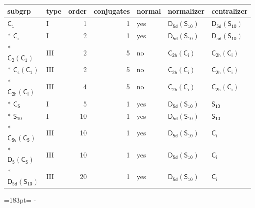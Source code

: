\documentclass[10pt,a4paper]{article}
\newcommand{\needspace}[1]{\par\penalty-100\begingroup\dimen0=#1\relax\dimen2=\pagegoal
  \advance\dimen2-\pagetotal\ifdim\dimen0>\dimen2\relax\ifdim\dimen2>0pt\vfil\break\fi\fi
  \endgroup}
\numberwithin{equation}{section}
\newcommand{\grp}[1]{\mathsf{#1}}
\begin{document}
{\small\begin{longtable}{@{}llrrlll@{}}\toprule
subgrp & type & order & conjugates & normal & normalizer & centralizer\\\midrule\endhead
\bottomrule\endfoot\endlastfoot
\href{../../../rotation/data/pdf/C1.pdf}{$\grp{C_{1}}$} & I & 1 & 1 & yes & \href{D5d-S10.pdf}{$\grp{D_{5d}}(\grp{S_{10}})$} & \href{D5d-S10.pdf}{$\grp{D_{5d}}(\grp{S_{10}})$}\\*
\href{../../../rotation/data/pdf/S2.pdf}{$\grp{C_{i}}$} & I & 2 & 1 & yes & \href{D5d-S10.pdf}{$\grp{D_{5d}}(\grp{S_{10}})$} & \href{D5d-S10.pdf}{$\grp{D_{5d}}(\grp{S_{10}})$}\\*
\href{C2-C1.pdf}{$\grp{C_{2}}(\grp{C_{1}})$} & III & 2 & 5 & no & \href{C2h-S2.pdf}{$\grp{C_{2h}}(\grp{C_{i}})$} & \href{C2h-S2.pdf}{$\grp{C_{2h}}(\grp{C_{i}})$}\\*
\href{C1v-C1.pdf}{$\grp{C_{s}}(\grp{C_{1}})$} & III & 2 & 5 & no & \href{C2h-S2.pdf}{$\grp{C_{2h}}(\grp{C_{i}})$} & \href{C2h-S2.pdf}{$\grp{C_{2h}}(\grp{C_{i}})$}\\*
\href{C2h-S2.pdf}{$\grp{C_{2h}}(\grp{C_{i}})$} & III & 4 & 5 & no & \href{C2h-S2.pdf}{$\grp{C_{2h}}(\grp{C_{i}})$} & \href{C2h-S2.pdf}{$\grp{C_{2h}}(\grp{C_{i}})$}\\*
\href{../../../rotation/data/pdf/C5.pdf}{$\grp{C_{5}}$} & I & 5 & 1 & yes & \href{D5d-S10.pdf}{$\grp{D_{5d}}(\grp{S_{10}})$} & \href{../../../rotation/data/pdf/S10.pdf}{$\grp{S_{10}}$}\\*
\href{../../../rotation/data/pdf/S10.pdf}{$\grp{S_{10}}$} & I & 10 & 1 & yes & \href{D5d-S10.pdf}{$\grp{D_{5d}}(\grp{S_{10}})$} & \href{../../../rotation/data/pdf/S10.pdf}{$\grp{S_{10}}$}\\*
\href{C5v-C5.pdf}{$\grp{C_{5v}}(\grp{C_{5}})$} & III & 10 & 1 & yes & \href{D5d-S10.pdf}{$\grp{D_{5d}}(\grp{S_{10}})$} & \href{../../../rotation/data/pdf/S2.pdf}{$\grp{C_{i}}$}\\*
\href{D5-C5.pdf}{$\grp{D_{5}}(\grp{C_{5}})$} & III & 10 & 1 & yes & \href{D5d-S10.pdf}{$\grp{D_{5d}}(\grp{S_{10}})$} & \href{../../../rotation/data/pdf/S2.pdf}{$\grp{C_{i}}$}\\*
\href{D5d-S10.pdf}{$\grp{D_{5d}}(\grp{S_{10}})$} & III & 20 & 1 & yes & \href{D5d-S10.pdf}{$\grp{D_{5d}}(\grp{S_{10}})$} & \href{../../../rotation/data/pdf/S2.pdf}{$\grp{C_{i}}$}\\
\bottomrule\end{longtable}}
\needspace{183pt}
\end{document}

